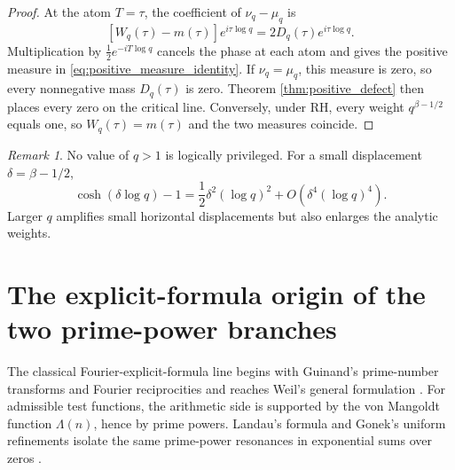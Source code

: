 \documentclass[11pt]{amsart}
\numberwithin{equation}{section}
\theoremstyle{plain}
\theoremstyle{definition}
\theoremstyle{remark}
\newtheorem{remark}[theorem]{Remark}
\newcommand{\RH}{\mathrm{RH}}
\newcommand{\1}{\mathbf{1}}
\begin{document}
\begin{proof}
At the atom \(T=\tau\), the coefficient of \(\nu_q-\mu_q\) is
\begin{equation}
\left[W_q(\tau)-m(\tau)\right]e^{i\tau\log q}
=
2D_q(\tau)e^{i\tau\log q}.
\label{eq:atomic_difference_coefficient}
\end{equation}
Multiplication by \(\frac12e^{-iT\log q}\) cancels the phase at each
atom and gives the positive measure in
\eqref{eq:positive_measure_identity}.  If \(\nu_q=\mu_q\), this measure
is zero, so every nonnegative mass \(D_q(\tau)\) is zero.  Theorem
\ref{thm:positive_defect} then places every zero on the critical line.
Conversely, under \(\RH\), every weight \(q^{\beta-1/2}\) equals one, so
\(W_q(\tau)=m(\tau)\) and the two measures coincide.
\end{proof}

\begin{remark}
\label{rem:q_sensitivity}
No value of \(q>1\) is logically privileged.  For a small displacement
\(\delta=\beta-1/2\),
\begin{equation}
\cosh(\delta\log q)-1
=
\frac12\delta^2(\log q)^2
+
O\left(\delta^4(\log q)^4\right).
\label{eq:q_sensitivity}
\end{equation}
Larger \(q\) amplifies small horizontal displacements but also enlarges
the analytic weights.
\end{remark}

\section{The explicit-formula origin of the two prime-power branches}
\label{sec:explicit_formula_branches}

The classical Fourier-explicit-formula line begins with Guinand's prime-number transforms and Fourier reciprocities and reaches Weil's general formulation \cite{Guinand1947,Guinand1949,Guinand1948,Weil1952}.  For admissible test functions, the arithmetic side is supported by the von Mangoldt function \(\Lambda(n)\), hence by prime powers.
Landau's formula and Gonek's uniform refinements isolate the same
prime-power resonances in exponential sums over zeros
\cite{Gonek1985,FordZaharescu2005,FordSoundararajanZaharescu2009}.
\end{document}
